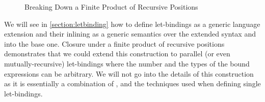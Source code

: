 \begin{figure}[h]
\caption{Breaking Down a Finite Product of Recursive Positions\label{figure:descprodelim}}
\end{figure}

We will see in \cref{section:letbinding} how to define let-bindings as a generic
language extension and their inlining as a generic semantics over the extended
syntax and into the base one. Closure under a finite product of recursive positions
demonstrates that we could extend this construction to parallel (or even mutually-recursive)
let-bindings where the number and the types of the bound expressions can be arbitrary.
We will not go into the details of this construction as it is essentially a combination
of ,  and the techniques used when defining single let-bindings.
